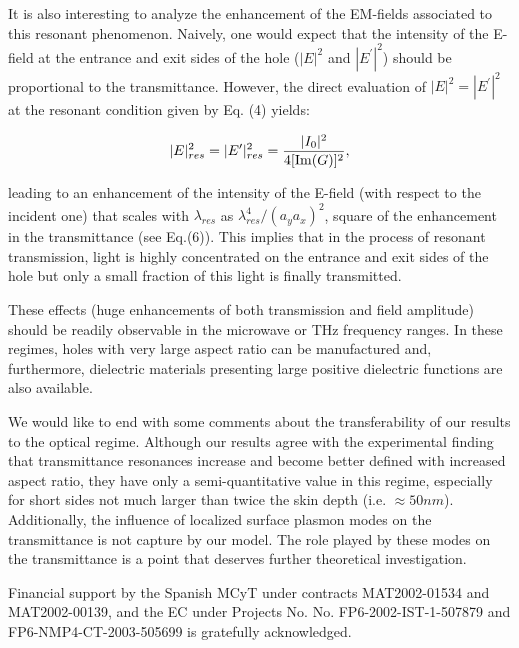 \documentclass[aps,prl,twocolumn,showpacs,superscriptaddress,floatfix]{revtex4}
\begin{document}
It is also interesting to analyze the enhancement of the EM-fields
associated to this resonant phenomenon. Naively, one would expect
that the intensity of the E-field at the entrance and exit sides
of the hole ($|E|^2$ and $|E^{\prime}|^2$) should be proportional
to the transmittance. However, the direct evaluation of
$|E|^2=|E^{\prime}|^2$ at the resonant condition given by Eq. (4)
yields:

\begin{equation}
|E|^{2}_{res}=|E^{\prime}|_{res}^{2}=\frac{|I_0|^2}{4[{\rm
Im}(G)]^2},
\end{equation}

\noindent leading to an enhancement of the intensity of the
E-field (with respect to the incident one) that scales with
$\lambda_{res}$ as $\lambda_{res}^{4}/(a_y a_x)^2$, square of the
enhancement in the transmittance (see Eq.(6)). This implies that
in the process of resonant transmission, light is highly
concentrated on the entrance and exit sides of the hole but only a
small fraction of this light is finally transmitted.

These effects (huge enhancements of both transmission and field
amplitude) should be readily observable in the microwave or THz
frequency ranges. In these regimes, holes with very large aspect
ratio can be manufactured and, furthermore, dielectric materials
presenting large positive dielectric functions are also available.

We would like to end with some comments about the transferability
of our results to the optical regime. Although our results agree
with the experimental finding that transmittance resonances
increase and become better defined with increased aspect ratio,
they have only a semi-quantitative value in this regime,
especially for short sides not much larger than twice the skin
depth (i.e. $\approx 50nm$). Additionally, the influence of
localized surface plasmon modes on the transmittance is not
capture by our model. The role played by these modes on the
transmittance is a point that deserves further theoretical
investigation.

Financial support by the Spanish MCyT under contracts
MAT2002-01534 and MAT2002-00139, and the EC under Projects No. No.
FP6-2002-IST-1-507879 and FP6-NMP4-CT-2003-505699 is gratefully
acknowledged.
\end{document}

